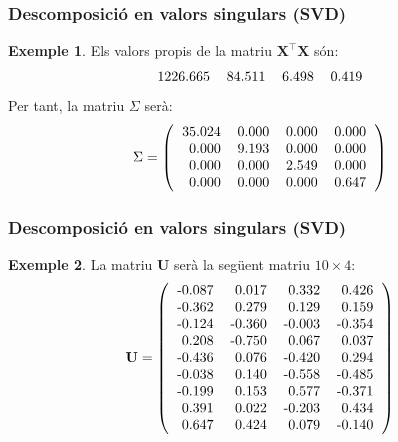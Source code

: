 \documentclass[12pt,t]{beamer}
\theoremstyle{plain}
\theoremstyle{definition}
\newtheorem{exemple}{Exemple}
\begin{document}
\begin{frame}
\frametitle{Descomposició en valors singulars  (SVD)}
\begin{exemple}
Els valors propis de la matriu $\mathbf{X}^\top\mathbf{X}$ són:
\[
\begin{tabular}{rrrr}
  1226.665 & 84.511 & 6.498 & 0.419 \\ 
  \end{tabular}\]
Per tant, la matriu $\Sigma$ serà:
\[
\Sigma =\left(
\begin{tabular}{rrrr}
  35.024 & 0.000 & 0.000 & 0.000 \\ 
  0.000 & 9.193 & 0.000 & 0.000 \\ 
  0.000 & 0.000 & 2.549 & 0.000 \\ 
  0.000 & 0.000 & 0.000 & 0.647 \\ 
  \end{tabular}\right)
\]
\end{exemple}
\end{frame}


\begin{frame}
\frametitle{Descomposició en valors singulars (SVD)}
\begin{exemple}
La matriu $\mathbf{U}$ serà la següent matriu $10\times 4$:
\[
\mathbf{U} =\left(
\begin{tabular}{rrrr}
  -0.087 & 0.017 & 0.332 & 0.426 \\ 
  -0.362 & 0.279 & 0.129 & 0.159 \\ 
  -0.124 & -0.360 & -0.003 & -0.354 \\ 
  0.208 & -0.750 & 0.067 & 0.037 \\ 
  -0.436 & 0.076 & -0.420 & 0.294 \\ 
  -0.038 & 0.140 & -0.558 & -0.485 \\ 
  -0.199 & 0.153 & 0.577 & -0.371 \\ 
  0.391 & 0.022 & -0.203 & 0.434 \\ 
  0.647 & 0.424 & 0.079 & -0.140 \\ 
  \end{tabular}\right)
\]
\end{exemple}
\end{frame}
\end{document}
